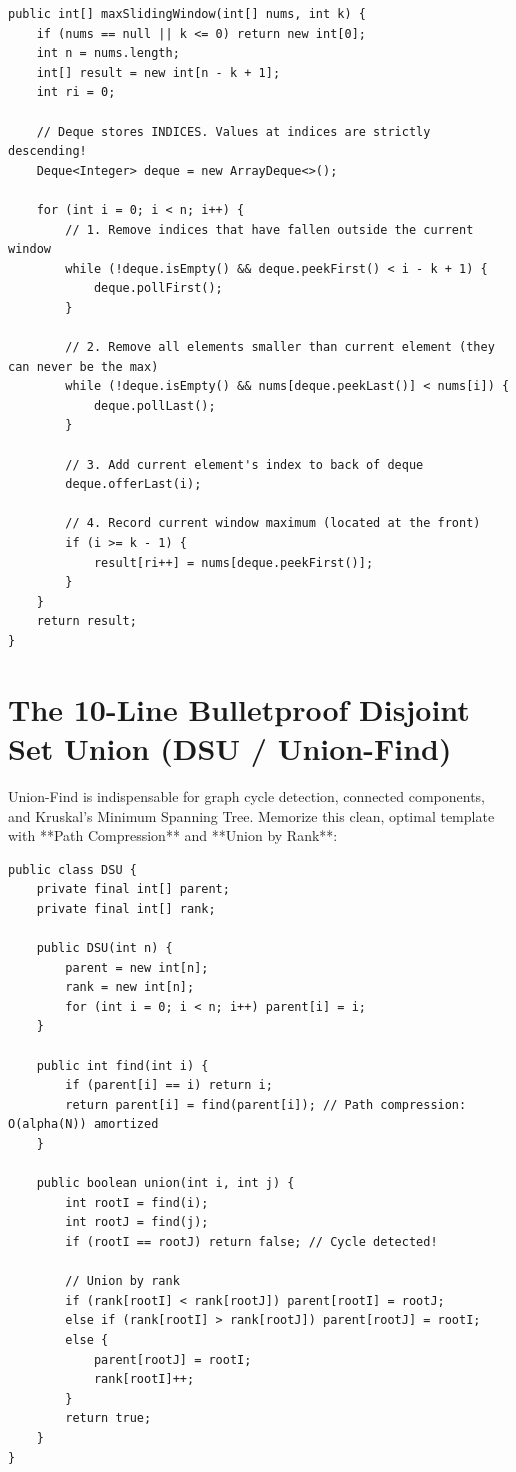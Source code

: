 \documentclass[10pt,journal,compsoc,onecolumn]{IEEEtran}
\begin{document}
\begin{verbatim}
public int[] maxSlidingWindow(int[] nums, int k) {
    if (nums == null || k <= 0) return new int[0];
    int n = nums.length;
    int[] result = new int[n - k + 1];
    int ri = 0;

    // Deque stores INDICES. Values at indices are strictly descending!
    Deque<Integer> deque = new ArrayDeque<>();

    for (int i = 0; i < n; i++) {
        // 1. Remove indices that have fallen outside the current window
        while (!deque.isEmpty() && deque.peekFirst() < i - k + 1) {
            deque.pollFirst();
        }

        // 2. Remove all elements smaller than current element (they can never be the max)
        while (!deque.isEmpty() && nums[deque.peekLast()] < nums[i]) {
            deque.pollLast();
        }

        // 3. Add current element's index to back of deque
        deque.offerLast(i);

        // 4. Record current window maximum (located at the front)
        if (i >= k - 1) {
            result[ri++] = nums[deque.peekFirst()];
        }
    }
    return result;
}
\end{verbatim}

\section{The 10-Line Bulletproof Disjoint Set Union (DSU / Union-Find)}
\label{sec:dsu}

Union-Find is indispensable for graph cycle detection, connected components, and Kruskal's Minimum Spanning Tree. Memorize this clean, optimal template with **Path Compression** and **Union by Rank**:

\begin{verbatim}
public class DSU {
    private final int[] parent;
    private final int[] rank;

    public DSU(int n) {
        parent = new int[n];
        rank = new int[n];
        for (int i = 0; i < n; i++) parent[i] = i;
    }

    public int find(int i) {
        if (parent[i] == i) return i;
        return parent[i] = find(parent[i]); // Path compression: O(alpha(N)) amortized
    }

    public boolean union(int i, int j) {
        int rootI = find(i);
        int rootJ = find(j);
        if (rootI == rootJ) return false; // Cycle detected!

        // Union by rank
        if (rank[rootI] < rank[rootJ]) parent[rootI] = rootJ;
        else if (rank[rootI] > rank[rootJ]) parent[rootJ] = rootI;
        else {
            parent[rootJ] = rootI;
            rank[rootI]++;
        }
        return true;
    }
}
\end{verbatim}
\end{document}
